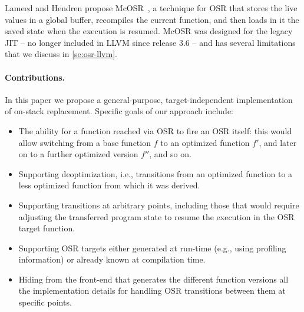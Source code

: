 Lameed and Hendren propose McOSR~\cite{lameed2013modular}, a technique for OSR that stores the live values in a global buffer, recompiles the current function, and then loads in it the saved state when the execution is resumed. McOSR was designed for the legacy JIT -- no longer included in LLVM since release 3.6 -- and has several limitations that we discuss in \mysection\ref{se:osr-llvm}.

\paragraph{Contributions.}
In this paper we propose a general-purpose, target-independent implementation of on-stack replacement. Specific goals of our approach include:
\begin{itemize}
\item The ability for a function reached via OSR to fire an OSR itself: this would allow switching from a base function $f$ to an optimized function $f'$, and later on to a further optimized version $f''$, and so on.
\item Supporting deoptimization, i.e., transitions from an optimized function to a less optimized function from which it was derived.
\item Supporting transitions at arbitrary points, including those that would require adjusting the transferred program state to resume the execution in the OSR target function.
\item Supporting OSR targets either generated at run-time (e.g., using profiling information) or already known at compilation time.
\item Hiding from the front-end that generates the different function versions all the implementation details for handling OSR transitions between them at specific points.
\end{itemize}

